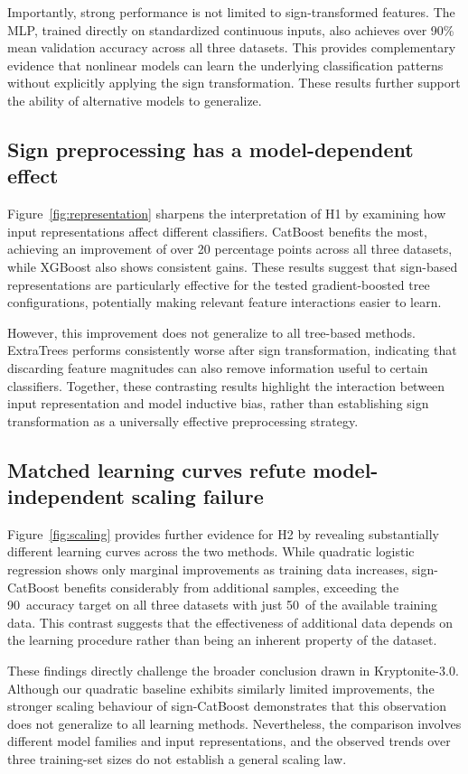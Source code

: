 \documentclass{article}
\begin{document}
Importantly, strong performance is not limited to sign-transformed features. The MLP, trained directly on standardized continuous inputs, also achieves over 90\% mean validation accuracy across all three datasets. This provides complementary evidence that nonlinear models can learn the underlying classification patterns without explicitly applying the sign transformation. These results further support the ability of alternative models to generalize.

\subsection{Sign preprocessing has a model-dependent effect}
Figure~\ref{fig:representation} sharpens the interpretation of H1 by examining how input representations affect different classifiers. CatBoost benefits the most, achieving an improvement of over 20 percentage points across all three datasets, while XGBoost also shows consistent gains. These results suggest that sign-based representations are particularly effective for the tested gradient-boosted tree configurations, potentially making relevant feature interactions easier to learn.

However, this improvement does not generalize to all tree-based methods. ExtraTrees performs consistently worse after sign transformation, indicating that discarding feature magnitudes can also remove information useful to certain classifiers. Together, these contrasting results highlight the interaction between input representation and model inductive bias, rather than establishing sign transformation as a universally effective preprocessing strategy.

\subsection{Matched learning curves refute model-independent scaling failure}
Figure~\ref{fig:scaling} provides further evidence for H2 by revealing substantially different learning curves across the two methods. While quadratic logistic regression shows only marginal improvements as training data increases, sign-CatBoost benefits considerably from additional samples, exceeding the 90\ accuracy target on all three datasets with just 50\ of the available training data. This contrast suggests that the effectiveness of additional data depends on the learning procedure rather than being an inherent property of the dataset.

These findings directly challenge the broader conclusion drawn in Kryptonite-3.0. Although our quadratic baseline exhibits similarly limited improvements, the stronger scaling behaviour of sign-CatBoost demonstrates that this observation does not generalize to all learning methods. Nevertheless, the comparison involves different model families and input representations, and the observed trends over three training-set sizes do not establish a general scaling law.
\end{document}
